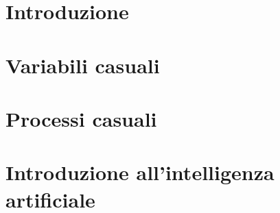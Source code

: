 
\chapter{Introduzione}


\chapter{Variabili casuali}


\chapter{Processi casuali}


\chapter{Introduzione all'intelligenza artificiale}

